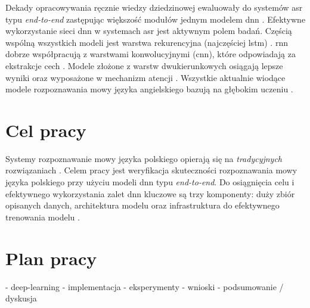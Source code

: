 Dekady opracowywania ręcznie wiedzy dziedzinowej ewaluowały do systemów \acrshort{asr} typu \textit{end-to-end} zastępując większość modułów jednym modelem \acrshort{dnn} \cite{ds2}. Efektywne wykorzystanie sieci \acrshort{dnn} w systemach \acrshort{asr} jest aktywnym polem badań. Częścią wspólną wszystkich modeli jest warstwa rekurencyjna (najczęściej \acrshort{lstm}) \cite{ds2:lstm1, ds2:lstm2, ds2:lstm3}. \acrlong{rnn} dobrze współpracują z warstwami konwolucyjnymi (\acrshort{cnn}), które odpowiadają za ekstrakcje cech \cite{ds2:lstm_and_conv}. Modele złożone z warstw dwukierunkowych osiągają lepsze wyniki \cite{ds2:lstm1} oraz wyposażone w mechanizm atencji \cite{ds2:attention_1, ds2:attention_2}. Wszystkie aktualnie wiodące modele rozpoznawania mowy języka angielskiego bazują na głębokim uczeniu \cite{ds3_top6,ds3_top5,ds3_top4,ds3_top3,ds3_top2,ds3_top1}. 

\section{Cel pracy}
Systemy rozpoznawanie mowy języka polskiego opierają się na \textit{tradycyjnych} rozwiązaniach \cite{pjatk_corpus}. Celem pracy jest weryfikacja skuteczności rozpoznawania mowy języka polskiego przy użyciu modeli \acrlong{dnn} typu \textit{end-to-end}. Do osiągnięcia celu i efektywnego wykorzystania zalet \acrshort{dnn} kluczowe są trzy komponenty: duży zbiór opisanych danych, architektura modelu oraz infrastruktura do efektywnego trenowania modelu \cite{ds2}. 

\section{Plan pracy}
- deep-learning
- implementacja
- eksperymenty
- wnioski
- podsumowanie / dyskusja











